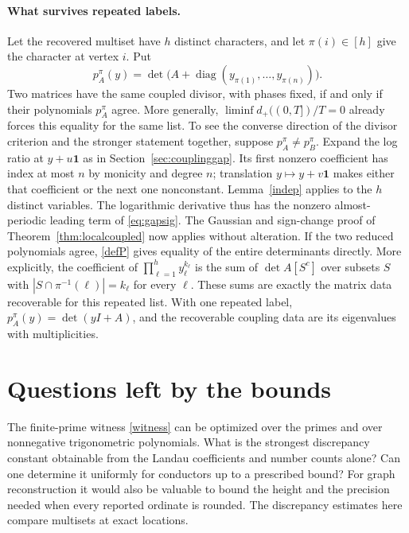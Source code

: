 \documentclass[11pt]{article}
\newcommand{\diag}{\operatorname{diag}}
\begin{document}
\paragraph{What survives repeated labels.}
Let the recovered multiset have $h$ distinct characters, and let $\pi(i)\in[h]$ give the character at vertex $i$. Put
\[
 p_A^\pi(y)=\det\bigl(A+\diag(y_{\pi(1)},\ldots,y_{\pi(n)})\bigr).
\]
Two matrices have the same coupled divisor, with phases fixed, if and only if their polynomials $p_A^\pi$ agree. More generally, $\liminf d_+((0,T])/T=0$ already forces this equality for the same list. To see the converse direction of the divisor criterion and the stronger statement together, suppose $p_A^\pi\ne p_B^\pi$. Expand the log ratio at $y+u\boldsymbol 1$ as in Section~\ref{sec:couplinggap}. Its first nonzero coefficient has index at most $n$ by monicity and degree $n$; translation $y\mapsto y+v\boldsymbol 1$ makes either that coefficient or the next one nonconstant. Lemma~\ref{indep} applies to the $h$ distinct variables. The logarithmic derivative thus has the nonzero almost-periodic leading term of \eqref{eq:gapsig}. The Gaussian and sign-change proof of Theorem~\ref{thm:localcoupled} now applies without alteration. If the two reduced polynomials agree, \eqref{defP} gives equality of the entire determinants directly. More explicitly, the coefficient of $\prod_{\ell=1}^h y_\ell^{k_\ell}$ is the sum of $\det A[S^c]$ over subsets $S$ with $|S\cap\pi^{-1}(\ell)|=k_\ell$ for every $\ell$. These sums are exactly the matrix data recoverable for this repeated list. With one repeated label, $p_A^\pi(y)=\det(yI+A)$, and the recoverable coupling data are its eigenvalues with multiplicities.


\section{Questions left by the bounds}
The finite-prime witness \eqref{witness} can be optimized over the primes and over nonnegative trigonometric polynomials. What is the strongest discrepancy constant obtainable from the Landau coefficients and number counts alone? Can one determine it uniformly for conductors up to a prescribed bound? For graph reconstruction it would also be valuable to bound the height and the precision needed when every reported ordinate is rounded. The discrepancy estimates here compare multisets at exact locations.
\end{document}
